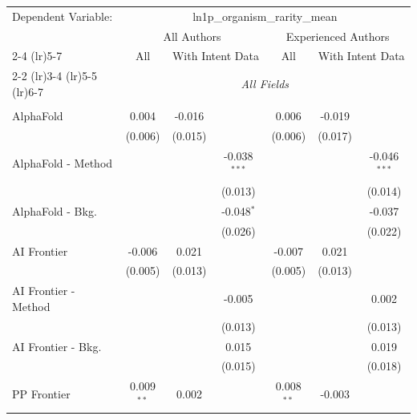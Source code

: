 \begingroup
\centering
\begin{tabular}{lcccccc}
   \tabularnewline \midrule \midrule
   Dependent Variable: & \multicolumn{6}{c}{ln1p\_organism\_rarity\_mean}\\
 & \multicolumn{3}{c}{All Authors} & \multicolumn{3}{c}{Experienced Authors} \\
\cmidrule(lr){2-4} \cmidrule(lr){5-7}
 & \multicolumn{1}{c}{All} & \multicolumn{2}{c}{With Intent Data} & \multicolumn{1}{c}{All} & \multicolumn{2}{c}{With Intent Data} \\
\cmidrule(lr){2-2} \cmidrule(lr){3-4} \cmidrule(lr){5-5} \cmidrule(lr){6-7}
 & \multicolumn{6}{c}{\textit{All Fields}} \\ \\
   AlphaFold            & 0.004        & -0.016  &                & 0.006        & -0.019  &   \\   
                        & (0.006)      & (0.015) &                & (0.006)      & (0.017) &   \\   
   AlphaFold - Method   &              &         & -0.038$^{***}$ &              &         & -0.046$^{***}$\\   
                        &              &         & (0.013)        &              &         & (0.014)\\   
   AlphaFold - Bkg.     &              &         & -0.048$^{*}$   &              &         & -0.037\\   
                        &              &         & (0.026)        &              &         & (0.022)\\   
   AI Frontier          & -0.006       & 0.021   &                & -0.007       & 0.021   &   \\   
                        & (0.005)      & (0.013) &                & (0.005)      & (0.013) &   \\   
   AI Frontier - Method &              &         & -0.005         &              &         & 0.002\\   
                        &              &         & (0.013)        &              &         & (0.013)\\   
   AI Frontier - Bkg.   &              &         & 0.015          &              &         & 0.019\\   
                        &              &         & (0.015)        &              &         & (0.018)\\   
   PP Frontier          & 0.009$^{**}$ & 0.002   &                & 0.008$^{**}$ & -0.003  &   \\   

\end{tabular}

